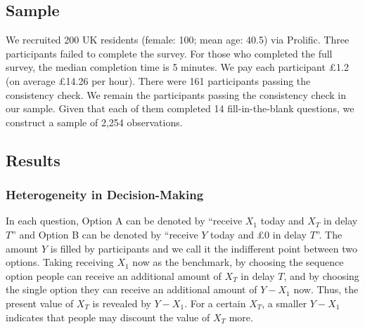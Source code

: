 \documentclass[
  12pt,
]{article}
\begin{document}
\hypertarget{sample-1}{%
\subsection{Sample}\label{sample-1}}

We recruited 200 UK residents (female: 100; mean age: 40.5) via
Prolific. Three participants failed to complete the survey. For those
who completed the full survey, the median completion time is 5 minutes.
We pay each participant £1.2 (on average £14.26 per hour). There were
161 participants passing the consistency check. We remain the
participants passing the consistency check in our sample. Given that
each of them completed 14 fill-in-the-blank questions, we construct a
sample of 2,254 observations.

\hypertarget{results-1}{%
\subsection{Results}\label{results-1}}

\hypertarget{heterogeneity-in-decision-making}{%
\subsubsection{Heterogeneity in
Decision-Making}\label{heterogeneity-in-decision-making}}

In each question, Option A can be denoted by ``receive \(X_1\) today and
\(X_T\) in delay \(T\)'' and Option B can be denoted by ``receive \(Y\)
today and £0 in delay \(T\)''. The amount \(Y\) is filled by
participants and we call it the indifferent point between two options.
Taking receiving \(X_1\) now as the benchmark, by choosing the sequence
option people can receive an additional amount of \(X_T\) in delay
\(T\), and by choosing the single option they can receive an additional
amount of \(Y - X_1\) now. Thus, the present value of \(X_T\) is
revealed by \(Y-X_1\). For a certain \(X_T\), a smaller \(Y-X_1\)
indicates that people may discount the value of \(X_T\) more.
\end{document}
